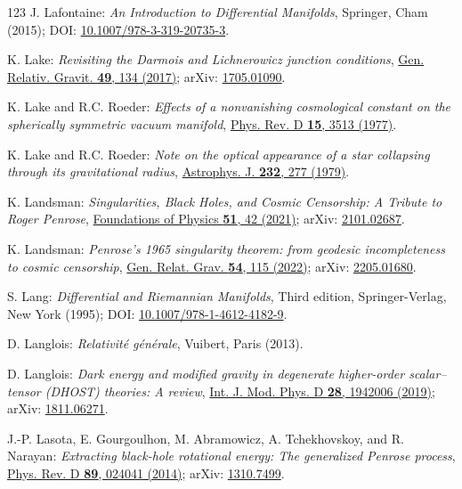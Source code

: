\begin{thebibliography}{123}
J. Lafontaine: {\em An Introduction to Differential Manifolds},
Springer, Cham (2015);
DOI: \href{https://doi.org/10.1007/978-3-319-20735-3}{10.1007/978-3-319-20735-3}.

K. Lake:
{\em Revisiting the Darmois and Lichnerowicz junction conditions},
\href{https://doi.org/10.1007/s10714-017-2300-1}{Gen. Relativ. Gravit. {\bf 49}, 134 (2017)};
arXiv: \href{https://arxiv.org/abs/1705.01090}{1705.01090}.

K. Lake and R.C. Roeder:
{\em Effects of a nonvanishing cosmological constant on the spherically symmetric vacuum manifold},
\href{https://doi.org/10.1103/PhysRevD.15.3513}{Phys. Rev. D {\bf 15}, 3513 (1977)}.

K. Lake and R.C. Roeder:
{\em Note on the optical appearance of a star collapsing through its gravitational radius},
\href{https://doi.org/10.1086/157286}{Astrophys. J. {\bf 232}, 277 (1979)}.

K. Landsman:
{\em Singularities, Black Holes, and Cosmic Censorship:
A Tribute to Roger Penrose},
\href{https://doi.org/10.1007/s10701-021-00432-1}{Foundations of Physics {\bf 51}, 42 (2021)};
arXiv: \href{https://arxiv.org/abs/2101.02687}{2101.02687}.

K. Landsman:
{\em Penrose's 1965 singularity theorem: from geodesic incompleteness to cosmic censorship},
\href{https://doi.org/10.1007/s10714-022-02973-w}{Gen. Relat. Grav. {\bf 54}, 115 (2022)};
arXiv: \href{https://arxiv.org/abs/2205.01680}{2205.01680}.

S. Lang:
{\em Differential and Riemannian Manifolds},
Third edition,
Springer-Verlag, New York (1995);
DOI: \href{https://doi.org/10.1007/978-1-4612-4182-9}{10.1007/978-1-4612-4182-9}.

D. Langlois:
{\em Relativité générale},
Vuibert, Paris (2013).

D. Langlois:
{\em Dark energy and modified gravity in degenerate higher-order scalar–tensor (DHOST) theories: A review},
\href{https://doi.org/10.1142/S0218271819420069}{Int. J. Mod. Phys. D {\bf 28}, 1942006 (2019)};
arXiv: \href{https://arxiv.org/abs/1811.06271}{1811.06271}.

J.-P. Lasota, E. Gourgoulhon, M. Abramowicz, A. Tchekhovskoy,
and R. Narayan:
{\em Extracting black-hole rotational energy: The generalized Penrose process},
\href{https://doi.org/10.1103/PhysRevD.89.024041}{Phys. Rev. D {\bf 89}, 024041 (2014)};
arXiv: \href{https://arxiv.org/abs/1310.7499}{1310.7499}.


\end{thebibliography}
